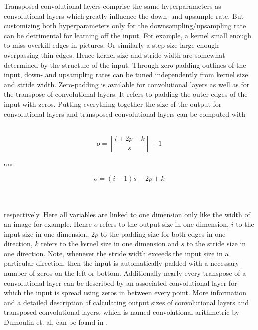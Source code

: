 Transposed convolutional layers comprise the same hyperparameters as convolutional layers which greatly influence the down- and upsample rate. But customizing both hyperparameters only for the downsampling/upsampling rate can be detrimental for learning off the input. For example, a kernel small enough to miss overkill edges in pictures. Or similarly a step size large enough overpassing thin edges. Hence kernel size and stride width are somewhat determined by the structure of the input. Through zero-padding outlines of the input, down- and upsampling rates can be tuned independently from kernel size and stride width. Zero-padding is available for convolutional layers as well as for the transpose of convolutional layers. It refers to padding the outer edges of the input with zeros. Putting everything together the size of the output for convolutional layers and transposed convolutional layers can be computed with\\\\
\noindent\begin{minipage}{.45\textwidth}
	\begin{equation}
		o = \left[\frac{i+2p-k}{s}\right]+1  
	\end{equation}
\end{minipage}\hfill and %
\begin{minipage}{.45\textwidth}
	\begin{equation}
		o = (i-1)s - 2p + k
	\end{equation}\label{Eq:transconv}
\end{minipage}\\\\
respectively. Here all variables are linked to one dimension only like the width of an image for example. Hence $o$ refers to the output size in one dimension, $i$ to the input size in one dimension, $2p$ to the padding size for both edges in one direction, $k$ refers to the kernel size in one dimension and $s$ to the stride size in one direction. Note, whenever the stride width exceeds the input size in a particular direction, then the input is automatically padded with a necessary number of zeros on the left or bottom. Additionally nearly every transpose of a convolutional layer can be described by an associated convolutional layer for which the input is spread using zeros in between every point. More information and a detailed description of calculating output sizes of convolutional layers and transposed convolutional layers, which is named convolutional arithmetric by Dumoulin et. al, can be found in \cite{dumoulin2018guide}.  
